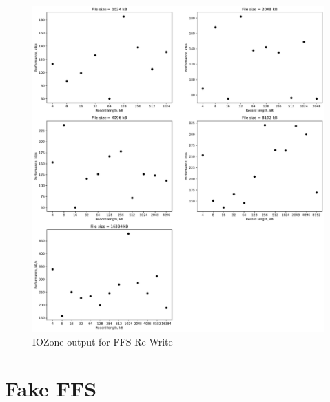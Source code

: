 \begin{figure}[!htb]
	\label{fig:app_bench_ffs_rnd_read}
	\begin{center}
		\includegraphics[width=1.0\textwidth]{figures/benchmarking/ffs/Re-Write.pdf}
	\end{center}
	\caption{IOZone output for FFS Re-Write}
\end{figure}


\section{Fake FFS}








